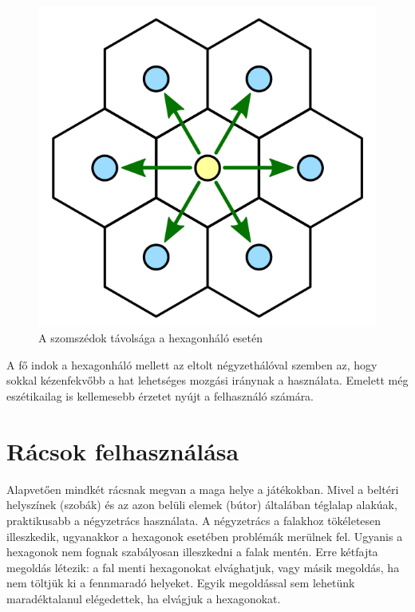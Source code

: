 \begin{figure}[h]
\centering
\includegraphics[scale=0.2]{kepek/img23.png}
\caption{A szomszédok távolsága a hexagonháló esetén}
\label{fig:img23}
\end{figure}

\noindent A fő indok a hexagonháló mellett az eltolt négyzethálóval szemben az, hogy sokkal kézenfekvőbb a hat lehetséges mozgási iránynak a használata. Emelett még eszétikailag is kellemesebb érzetet nyújt a felhasználó számára.

\section{Rácsok felhasználása}

Alapvetően mindkét rácsnak megvan a maga helye a játékokban. 
\newline
\newline Mivel a beltéri helyszínek (szobák) és az azon belüli elemek (bútor) általában téglalap alakúak, praktikusabb a négyzetrács használata. A négyzetrács a falakhoz tökéletesen illeszkedik, ugyanakkor a hexagonok esetében problémák merülnek fel. Ugyanis a hexagonok nem fognak szabályosan illeszkedni a falak mentén. Erre kétfajta megoldás létezik: a fal menti hexagonokat elvághatjuk, vagy másik megoldás, ha nem töltjük ki a fennmaradó helyeket. Egyik megoldással sem lehetünk maradéktalanul elégedettek, ha elvágjuk a hexagonokat. 
\newline

